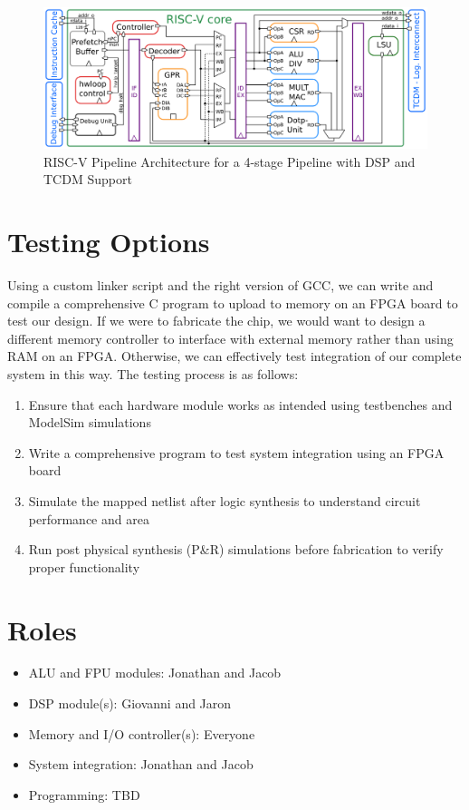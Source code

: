 \documentclass[12pt]{article}
\begin{document}
\begin{figure}[h!]
    \centering
    \includegraphics[width=\linewidth]{Proposal/core_archi.png}
    \caption{RISC-V Pipeline Architecture for a 4-stage Pipeline with DSP and TCDM Support \cite{gautschi2016nearthresholdriscvcoredsp}}
    \label{fig:block-diagram}
\end{figure}

\section*{Testing Options}
Using a custom linker script and the right version of GCC, we can write and compile a comprehensive C program to upload to memory on an FPGA board to test our design. If we were to fabricate the chip, we would want to design a different memory controller to interface with external memory rather than using RAM on an FPGA. Otherwise, we can effectively test integration of our complete system in this way. The testing process is as follows:

\begin{enumerate}
    \item Ensure that each hardware module works as intended using testbenches and ModelSim simulations
    \item Write a comprehensive program to test system integration using an FPGA board
    \item Simulate the mapped netlist after logic synthesis to understand circuit performance and area
    \item Run post physical synthesis (P\&R) simulations before fabrication to verify proper functionality
\end{enumerate}


\section*{Roles}

\begin{itemize}
    \item ALU and FPU modules: Jonathan and Jacob
    \item DSP module(s): Giovanni and Jaron
    \item Memory and I/O controller(s): Everyone
    \item System integration: Jonathan and Jacob
    \item Programming: TBD
\end{itemize}



\end{document}
